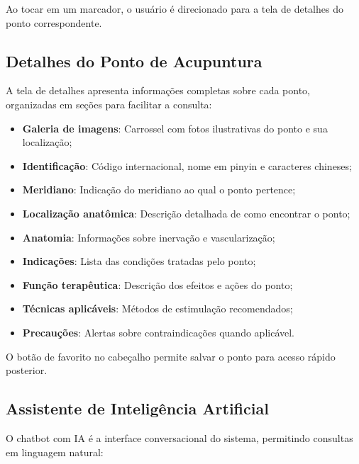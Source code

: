 Ao tocar em um marcador, o usuário é direcionado para a tela de detalhes do ponto correspondente.


\subsection{Detalhes do Ponto de Acupuntura}

A tela de detalhes apresenta informações completas sobre cada ponto, organizadas em seções para facilitar a consulta:

\begin{itemize}
    \item \textbf{Galeria de imagens}: Carrossel com fotos ilustrativas do ponto e sua localização;
    \item \textbf{Identificação}: Código internacional, nome em pinyin e caracteres chineses;
    \item \textbf{Meridiano}: Indicação do meridiano ao qual o ponto pertence;
    \item \textbf{Localização anatômica}: Descrição detalhada de como encontrar o ponto;
    \item \textbf{Anatomia}: Informações sobre inervação e vascularização;
    \item \textbf{Indicações}: Lista das condições tratadas pelo ponto;
    \item \textbf{Função terapêutica}: Descrição dos efeitos e ações do ponto;
    \item \textbf{Técnicas aplicáveis}: Métodos de estimulação recomendados;
    \item \textbf{Precauções}: Alertas sobre contraindicações quando aplicável.
\end{itemize}

O botão de favorito no cabeçalho permite salvar o ponto para acesso rápido posterior.


\subsection{Assistente de Inteligência Artificial}

O chatbot com IA é a interface conversacional do sistema, permitindo consultas em linguagem natural:

